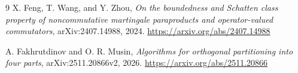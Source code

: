 \documentclass[11pt]{article}
\begin{document}
\begin{thebibliography}{9}
X. Feng, T. Wang, and Y. Zhou,
\emph{On the boundedness and Schatten class property of noncommutative martingale
paraproducts and operator-valued commutators},
arXiv:2407.14988, 2024.
\url{https://arxiv.org/abs/2407.14988}

A. Fakhrutdinov and O. R. Musin,
\emph{Algorithms for orthogonal partitioning into four parts},
arXiv:2511.20866v2, 2026.
\url{https://arxiv.org/abs/2511.20866}
\end{thebibliography}
\end{document}
